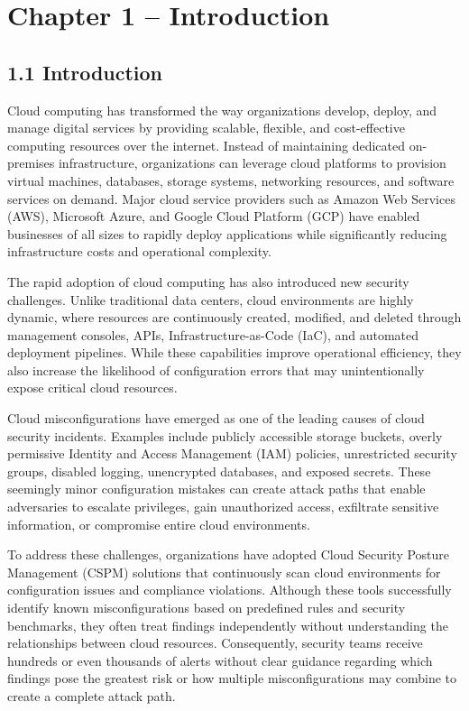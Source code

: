 \section{Chapter 1 -- Introduction}

\subsection{1.1 Introduction}

Cloud computing has transformed the way organizations develop, deploy, and manage digital services by providing scalable, flexible, and cost-effective computing resources over the internet. Instead of maintaining dedicated on-premises infrastructure, organizations can leverage cloud platforms to provision virtual machines, databases, storage systems, networking resources, and software services on demand. Major cloud service providers such as Amazon Web Services (AWS), Microsoft Azure, and Google Cloud Platform (GCP) have enabled businesses of all sizes to rapidly deploy applications while significantly reducing infrastructure costs and operational complexity.

The rapid adoption of cloud computing has also introduced new security challenges. Unlike traditional data centers, cloud environments are highly dynamic, where resources are continuously created, modified, and deleted through management consoles, APIs, Infrastructure-as-Code (IaC), and automated deployment pipelines. While these capabilities improve operational efficiency, they also increase the likelihood of configuration errors that may unintentionally expose critical cloud resources.

Cloud misconfigurations have emerged as one of the leading causes of cloud security incidents. Examples include publicly accessible storage buckets, overly permissive Identity and Access Management (IAM) policies, unrestricted security groups, disabled logging, unencrypted databases, and exposed secrets. These seemingly minor configuration mistakes can create attack paths that enable adversaries to escalate privileges, gain unauthorized access, exfiltrate sensitive information, or compromise entire cloud environments.

To address these challenges, organizations have adopted Cloud Security Posture Management (CSPM) solutions that continuously scan cloud environments for configuration issues and compliance violations. Although these tools successfully identify known misconfigurations based on predefined rules and security benchmarks, they often treat findings independently without understanding the relationships between cloud resources. Consequently, security teams receive hundreds or even thousands of alerts without clear guidance regarding which findings pose the greatest risk or how multiple misconfigurations may combine to create a complete attack path.

